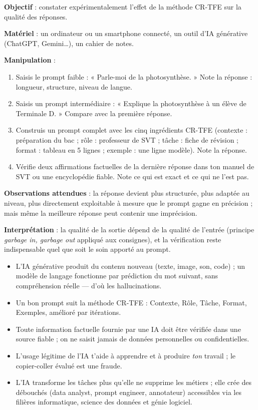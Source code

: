 \documentclass[11pt]{article}
\newcommand{\cle}[1]{{\popxbold\color{popdark}#1}}
\begin{document}
\begin{experience}
\textbf{Objectif} : constater expérimentalement l'effet de la méthode CR-TFE sur la qualité des réponses.
\medskip

\textbf{Matériel} : un ordinateur ou un smartphone connecté, un outil d'IA générative (ChatGPT, Gemini\ldots), un cahier de notes.
\medskip

\textbf{Manipulation} :
\begin{enumerate}
\item Saisis le prompt faible : « Parle-moi de la photosynthèse. » Note la réponse : longueur, structure, niveau de langue.
\item Saisis un prompt intermédiaire : « Explique la photosynthèse à un élève de Terminale D. » Compare avec la première réponse.
\item Construis un prompt complet avec les cinq ingrédients CR-TFE (contexte : préparation du bac ; rôle : professeur de SVT ; tâche : fiche de révision ; format : tableau en 5 lignes ; exemple : une ligne modèle). Note la réponse.
\item Vérifie deux affirmations factuelles de la dernière réponse dans ton manuel de SVT ou une encyclopédie fiable. Note ce qui est exact et ce qui ne l'est pas.
\end{enumerate}
\textbf{Observations attendues} : la réponse devient plus structurée, plus adaptée au niveau, plus directement exploitable à mesure que le prompt gagne en précision ; mais même la meilleure réponse peut contenir une imprécision.
\medskip

\textbf{Interprétation} : la qualité de la sortie dépend de la qualité de l'entrée (principe \emph{garbage in, garbage out} appliqué aux consignes), et la vérification reste indispensable quel que soit le soin apporté au prompt.
\end{experience}

\begin{aretenir}
\begin{itemize}
\item L'\cle{IA générative} produit du contenu nouveau (texte, image, son, code) ; un \cle{modèle de langage} fonctionne par prédiction du mot suivant, sans compréhension réelle — d'où les hallucinations.
\item Un bon prompt suit la méthode \cle{CR-TFE} : Contexte, Rôle, Tâche, Format, Exemples, amélioré par itérations.
\item Toute information factuelle fournie par une IA doit être vérifiée dans une source fiable ; on ne saisit jamais de données personnelles ou confidentielles.
\item L'usage légitime de l'IA t'aide à apprendre et à produire \emph{ton} travail ; le copier-coller évalué est une fraude.
\item L'IA transforme les tâches plus qu'elle ne supprime les métiers ; elle crée des débouchés (data analyst, prompt engineer, annotateur) accessibles via les filières informatique, science des données et génie logiciel.
\end{itemize}
\end{aretenir}
\end{document}
